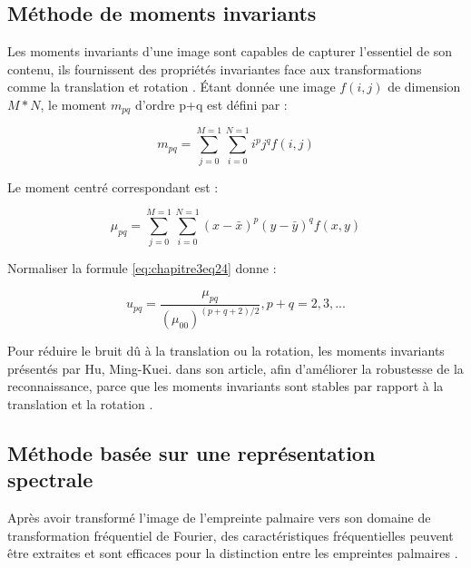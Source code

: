 \subsection{Méthode de moments invariants}
Les moments invariants d’une image sont capables de capturer l’essentiel de son contenu, ils fournissent des propriétés invariantes face aux transformations comme la translation et rotation \citep{ma2009palmprint}. 
Étant donnée une image $f(i,j)$ de dimension $M*N$, le moment $ m_{pq} $ d’ordre p+q est défini par :

\begin{center}
	\begin{equation}\label{eq:chapitre3eq23}
	m_{pq}=\sum_{j=0}^{M=1}\sum_{i=0}^{N=1}i^p j^q f(i,j) 
	\end{equation}
\end{center}
Le moment centré correspondant est :
\begin{center}
	\begin{equation}\label{eq:chapitre3eq24}
	\mu _{pq}=\sum_{j=0}^{M=1}\sum_{i=0}^{N=1}(x-\bar{x})^p(y-\bar{y})^qf(x,y)
	\end{equation}
\end{center}
Normaliser la formule \ref{eq:chapitre3eq24} donne :
\begin{center}
	\begin{equation}\label{eq:chapitre3eq25}
	u_{pq}=\frac{\mu_{pq}}{(\mu_{00})^{(p+q+2)/2}},p+q=2,3,... 
	\end{equation}
\end{center}
Pour réduire le bruit dû à la translation ou la rotation, les moments invariants présentés par Hu, Ming-Kuei. dans son article\citep{hu1962visual}, afin d’améliorer la robustesse de la reconnaissance, parce que les moments invariants sont stables par rapport à la translation et la rotation \citep{ma2009palmprint} \citep{noh2005palmprint}.
\subsection{Méthode basée sur une représentation spectrale}
Après avoir transformé l’image de l’empreinte palmaire vers son domaine de transformation fréquentiel de Fourier, des caractéristiques fréquentielles peuvent être extraites et sont efficaces pour la distinction entre les empreintes palmaires \citep{zhang2012comparative}.
